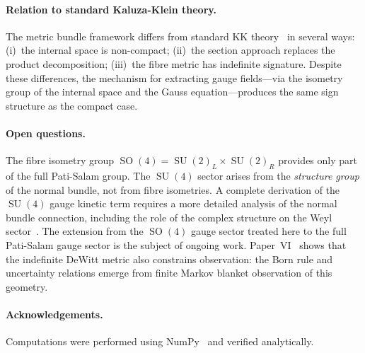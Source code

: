 \documentclass[12pt,a4paper]{article}
\theoremstyle{definition}
\newcommand{\SO}{\operatorname{SO}}
\newcommand{\SU}{\operatorname{SU}}
\begin{document}
\paragraph{Relation to standard Kaluza-Klein theory.}
The metric bundle framework differs from standard KK theory~\cite{Bailin1987} in several ways:
(i)~the internal space is non-compact;
(ii)~the section approach replaces the product decomposition;
(iii)~the fibre metric has indefinite signature.
Despite these differences, the mechanism for extracting gauge fields---via the isometry group of the internal space and the Gauss equation---produces the same sign structure as the compact case.

\paragraph{Open questions.}
The fibre isometry group $\SO(4) = \SU(2)_L \times \SU(2)_R$ provides only part of the full Pati-Salam group.
The $\SU(4)$ sector arises from the \emph{structure group} of the normal bundle, not from fibre isometries.
A complete derivation of the $\SU(4)$ gauge kinetic term requires a more detailed analysis of the normal bundle connection, including the role of the complex structure on the Weyl sector~\cite{Paper2}.
The extension from the $\SO(4)$ gauge sector treated here to the full Pati-Salam gauge sector is the subject of ongoing work.
Paper~VI~\cite{Paper6} shows that the indefinite DeWitt metric also constrains observation: the Born rule and uncertainty relations emerge from finite Markov blanket observation of this geometry.

\paragraph{Acknowledgements.}
Computations were performed using NumPy~\cite{numpy} and verified analytically.




\end{document}
